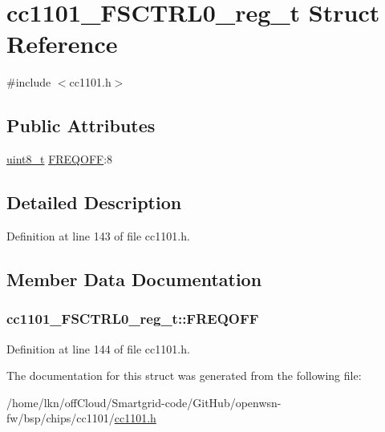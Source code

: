 \hypertarget{structcc1101___f_s_c_t_r_l0__reg__t}{}\section{cc1101\+\_\+\+F\+S\+C\+T\+R\+L0\+\_\+reg\+\_\+t Struct Reference}
\label{structcc1101___f_s_c_t_r_l0__reg__t}


{\ttfamily \#include $<$cc1101.\+h$>$}

\subsection*{Public Attributes}
\begin{DoxyCompactItemize}
\item 
\hyperlink{_p_e___types_8h_aba7bc1797add20fe3efdf37ced1182c5}{uint8\+\_\+t} \hyperlink{structcc1101___f_s_c_t_r_l0__reg__t_a095321f49c49acc2e0968693e9e80ae1}{F\+R\+E\+Q\+O\+FF}\+:8
\end{DoxyCompactItemize}


\subsection{Detailed Description}


Definition at line 143 of file cc1101.\+h.



\subsection{Member Data Documentation}
\subsubsection[{\texorpdfstring{F\+R\+E\+Q\+O\+FF}{FREQOFF}}]{ cc1101\+\_\+\+F\+S\+C\+T\+R\+L0\+\_\+reg\+\_\+t\+::\+F\+R\+E\+Q\+O\+FF}\hypertarget{structcc1101___f_s_c_t_r_l0__reg__t_a095321f49c49acc2e0968693e9e80ae1}{}\label{structcc1101___f_s_c_t_r_l0__reg__t_a095321f49c49acc2e0968693e9e80ae1}


Definition at line 144 of file cc1101.\+h.



The documentation for this struct was generated from the following file\+:\begin{DoxyCompactItemize}
\item 
/home/lkn/off\+Cloud/\+Smartgrid-\/code/\+Git\+Hub/openwsn-\/fw/bsp/chips/cc1101/\hyperlink{cc1101_8h}{cc1101.\+h}\end{DoxyCompactItemize}
